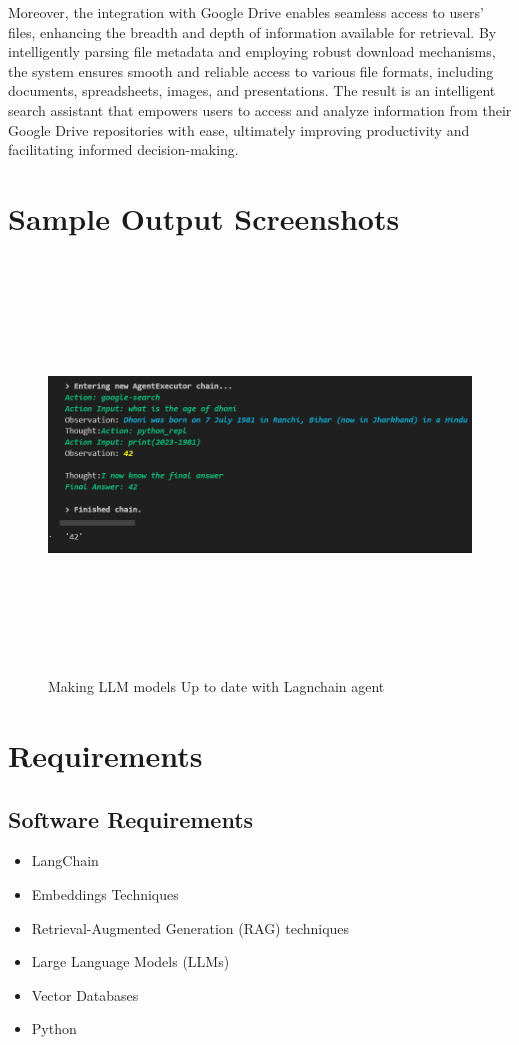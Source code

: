 \documentclass[12pt,a4paper,oneside]{report}
\begin{document}
Moreover, the integration with Google Drive enables seamless access to users' files, enhancing the breadth and depth of information available for retrieval. By intelligently parsing file metadata and employing robust download mechanisms, the system ensures smooth and reliable access to various file formats, including documents, spreadsheets, images, and presentations. The result is an intelligent search assistant that empowers users to access and analyze information from their Google Drive repositories with ease, ultimately improving productivity and facilitating informed decision-making.

\section{Sample Output Screenshots}

\begin{figure}[ht]
    \centering
    \includegraphics[width=145mm , height = 110mm]{Dhoni.png}
    \caption{Making LLM models Up to date with Lagnchain agent}
    \label{fig:figure2_2}
\end{figure}


\section{Requirements}
\subsection{Software Requirements}
\begin{itemize}
\item{LangChain}
\item{Embeddings Techniques}
\item{Retrieval-Augmented Generation (RAG) techniques}
\item{Large Language Models (LLMs)}
\item{Vector Databases}
\item{Python}
\end{itemize}
\end{document}
